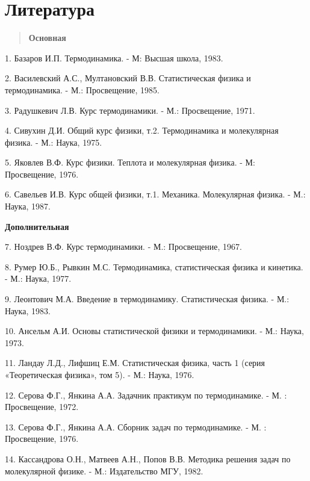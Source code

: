 \chapter{Литература}

\begin{quote}
\textbf{Основная}
\end{quote}

1. Базаров И.П. Термодинамика. - М: Высшая школа, 1983.

2. Василевский А.С., Мултановский В.В. Статистическая физика и
термодинамика. - М.: Просвещение, 1985.

3. Радушкевич Л.В. Курс термодинамики. - М.: Просвещение, 1971.

4. Сивухин Д.И. Общий курс физики, т.2. Термодинамика и молекулярная
физика. - М.: Наука, 1975.

5. Яковлев В.Ф. Курс физики. Теплота и молекулярная физика. - М:
Просвещение, 1976.

6. Савельев И.В. Курс общей физики, т.1. Механика. Молекулярная физика.
- М.: Наука, 1987.

\textbf{Дополнительная}

7. Ноздрев В.Ф. Курс термодинамики. - М.: Просвещение, 1967.

8. Румер Ю.Б., Рывкин М.С. Термодинамика, статистическая физика и
кинетика. - М.: Наука, 1977.

9. Леонтович М.А. Введение в термодинамику. Статистическая физика. - М.:
Наука, 1983.

10. Ансельм А.И. Основы статистической физики и термодинамики. - М.:
Наука, 1973.

11. Ландау Л.Д., Лифшиц Е.М. Статистическая физика, часть 1 (серия
«Теоретическая физика», том 5). - М.: Наука, 1976.

12. Серова Ф.Г., Янкина А.А. Задачник практикум по термодинамике. - М. :
Просвещение, 1972.

13. Серова Ф.Г., Янкина А.А. Сборник задач по термодинамике. - М. :
Просвещение, 1976.

14. Кассандрова О.Н., Матвеев А.Н., Попов В.В. Методика решения задач по
молекулярной физике. - М.: Издательство МГУ, 1982.